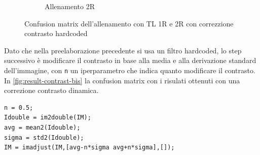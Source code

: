 \begin{figure}[H]
\begin{subfigure}{0.49\textwidth}
        \caption{Allenamento 2R} 
    \end{subfigure}
    \caption{Confusion matrix dell'allenamento con TL 1R e 2R con correzzione contrasto hardcoded}
    \label{fig:result-contrast}
\end{figure}

Dato che nella preelaborazione precedente si usa un filtro hardcoded, lo step successivo è modificare il  contrasto in base alla media e alla derivazione standard dell'immagine, con \lstinline{n} un iperparametro che indica quanto modificare il contrasto. In \cref{fig:result-contrast-bis}  la confusion matrix con i risulati ottenuti con una correzione contrasto dinamica.
\begin{lstlisting}
n = 0.5;  
Idouble = im2double(IM); 
avg = mean2(Idouble);
sigma = std2(Idouble);
IM = imadjust(IM,[avg-n*sigma avg+n*sigma],[]);
\end{lstlisting}

